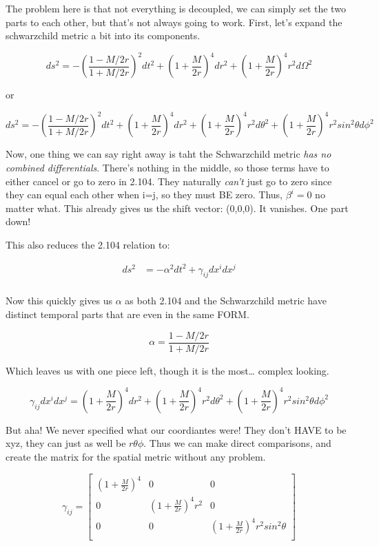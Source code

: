 \documentclass[landscape,letterpaper,10pt,english]{article}
\begin{document}
    The problem here is that not everything is decoupled, we can simply set
the two parts to each other, but that's not always going to work. First,
let's expand the schwarzchild metric a bit into its components.

\[ ds^2 = -\left( \frac{1-M/2r}{1+M/2r} \right)^2 dt^2 + \left( 1 + \frac{M}{2r}\right)^4 dr^2 + \left( 1 + \frac{M}{2r}\right)^4 r^2 d\Omega^2 \]

or

\[ ds^2 = -\left( \frac{1-M/2r}{1+M/2r} \right)^2 dt^2 + \left( 1 + \frac{M}{2r}\right)^4 dr^2 + \left( 1 + \frac{M}{2r}\right)^4 r^2 d\theta^2 + \left( 1 + \frac{M}{2r}\right)^4 r^2 sin^2\theta d\phi^2 \]

    Now, one thing we can say right away is taht the Schwarzchild metric
\emph{has no combined differentials}. There's nothing in the middle, so
those terms have to either cancel or go to zero in 2.104. They naturally
\emph{can't} just go to zero since they can equal each other when i=j,
so they must BE zero. Thus, \(\beta^i = 0\) no matter what. This already
gives us the shift vector: (0,0,0). It vanishes. One part down!

This also reduces the 2.104 relation to:

\[
\begin{align}
ds^2 &= -\alpha^2 dt^2 + \gamma_{ij}dx^idx^j \\
\end{align}
\]

    Now this quickly gives us \(\alpha\) as both 2.104 and the Schwarzchild
metric have distinct temporal parts that are even in the same FORM.

\[ \alpha = \frac{1-M/2r}{1+M/2r} \]

Which leaves us with one piece left, though it is the most\ldots{}
complex looking.

\[ \gamma_{ij}dx^idx^j = \left( 1 + \frac{M}{2r}\right)^4 dr^2 + \left( 1 + \frac{M}{2r}\right)^4 r^2 d\theta^2 + \left( 1 + \frac{M}{2r}\right)^4 r^2 sin^2\theta d\phi^2 \]

    But aha! We never specified what our coordiantes were! They don't HAVE
to be xyz, they can just as well be \(r\theta\phi\). Thus we can make
direct comparisons, and create the matrix for the spatial metric without
any problem.

\[
\gamma_{ij} = \begin{bmatrix}
\left( 1 + \frac{M}{2r}\right)^4 & 0 & 0 \\
0 & \left( 1 + \frac{M}{2r}\right)^4 r^2 & 0 \\
0 & 0 & \left( 1 + \frac{M}{2r}\right)^4 r^2 sin^2\theta \\
\end{bmatrix}
\]
\end{document}
